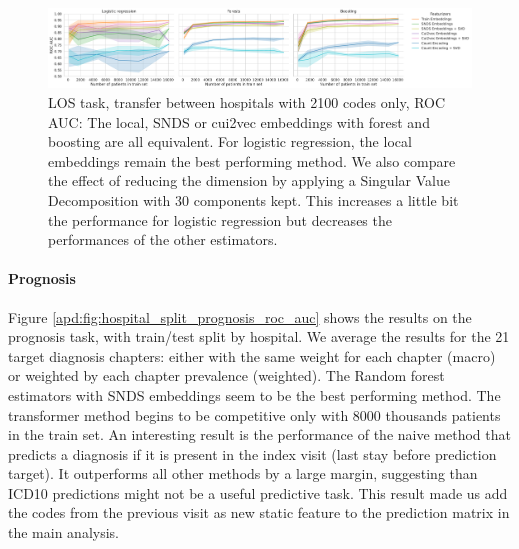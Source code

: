 \documentclass[french,12pt,twoside,a4paper]{book}
\begin{document}
\begin{appendices}
  \begin{figure}[!h]
    \centering
    \includegraphics[width=\textwidth]{img/chapter_3/hospital_split_los_decay7_roc_auc.pdf}
    \caption{LOS task, transfer between hospitals with 2100 codes only, ROC AUC:
      The local, SNDS or cui2vec embeddings with forest and boosting are all
      equivalent. For logistic regression, the local embeddings remain the best
      performing method. We also compare the effect of reducing the dimension by applying a
      Singular Value Decomposition with 30 components kept. This increases a
      little bit the performance for logistic regression but decreases the performances of the
      other estimators.}\label{apd:fig:hospital_split_los_decay7_roc_auc}
  \end{figure}


  \paragraph{Prognosis}\label{apd:hospital_split:prognosis}

  Figure \ref{apd:fig:hospital_split_prognosis_roc_auc} shows the results on the
  prognosis task, with train/test split by hospital. We average the results for
  the 21 target diagnosis chapters: either with the same weight for each chapter
  (macro) or weighted by each chapter prevalence (weighted). The Random forest estimators
  with SNDS embeddings seem to be the best performing method. The transformer
  method begins to be competitive only with 8000 thousands patients in the train
  set. An interesting result is the performance of the naive method that predicts
  a diagnosis if it is present in the index visit (last stay before prediction
  target). It outperforms all other methods by a large margin, suggesting than
  ICD10 predictions might not be a useful predictive task. This result made us add
  the codes from the previous visit as new static feature to the prediction matrix
  in the main analysis.


\end{appendices}
\end{document}
